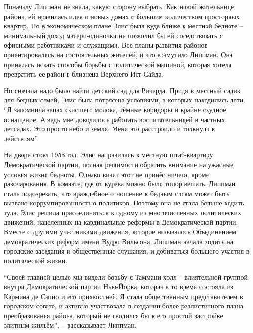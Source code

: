 Поначалу Липпман не знала, какую сторону выбрать. Как новой жительнице района, ей нравилась идея о новых домах с большим количеством просторных квартир. Но в экономическом плане Элис была куда ближе к местной бедноте -- минимальный доход матери-одиночки не позволил бы ей соседствовать с офисными работниками и служащими. Все планы развития районов ориентировались на состоятельных жителей, и это возмутило Липпман. Она принялась искать способы борьбы с политической машиной, которая хотела превратить её район в близнеца Верхнего Ист-Сайда.

Но сначала надо было найти детский сад для Ричарда. Придя в местный садик для бедных семей, Элис была потрясена условиями, в которых находились дети. \enquote{Я запомнила запах скисшего молока, тёмные коридоры и крайне скудное оснащение. А ведь мне доводилось работать воспитательницей в частных детсадах. Это просто небо и земля. Меня это расстроило и толкнуло к действиям}.

На дворе стоял 1958 год. Элис направилась в местную штаб-квартиру Демократической партии, полная решимости обратить внимание на ужасные условия жизни бедноты. Однако визит этот не принёс ничего, кроме разочарования. В комнате, где от курева можно было топор вешать, Липпман стала подозревать, что враждебное отношение к бедным слоям может быть вызвано коррумпированностью политиков. Поэтому она не стала больше ходить туда. Элис решила присоединиться к одному из многочисленных политических движений, нацеленных на кардинальные реформы в Демократической партии. Вместе с другими участниками движения, которое называлось Объединением демократических реформ имени Вудро Вильсона, Липпман начала ходить на городские заседания и общественные слушания, и добиваться большего участия в политической жизни.

\enquote{Своей главной целью мы видели борьбу с Таммани-холл -- влиятельной группой внутри Демократической партии Нью-Йорка, которая в то время состояла из Кармина де Сапио и его прихвостней. Я стала общественным представителем в городском совете, и активно участвовала в создании более реалистичного плана преобразования района, который не сводился бы к его простой застройке элитным жильём}, -- рассказывает Липпман.

